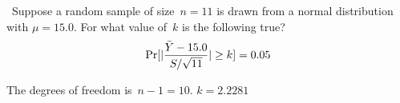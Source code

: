 \begin{problem}
  ~Suppose a random sample of size~${n=11}$ is drawn from a normal distribution with ${\mu = 15.0}$.  For what value of~$k$ is the following true?
  \begin{equation}
    \Pr\lbrack\lvert\frac{\bar{Y} - 15.0}{S/\sqrt{11}}\rvert \geq k\rbrack = 0.05
  \end{equation}
\end{problem}

The degrees of freedom is~${n - 1 = 10}$. ${k = 2.2281}$
